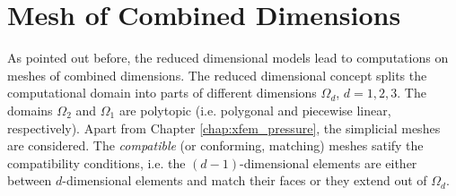 \section{Mesh of Combined Dimensions} \label{sec:mesh_combined}
As pointed out before, the reduced dimensional models lead to computations on meshes of combined dimensions.
The reduced dimensional concept splits the computational domain into parts of different dimensions
$\Omega_d$, $d=1,2,3$. The domains $\Omega_2$ and $\Omega_1$ are polytopic (i.e. polygonal and piecewise linear, respectively).
Apart from Chapter \ref{chap:xfem_pressure}, the simplicial meshes are considered.
The \emph{compatible} (or conforming, matching) meshes satify the compatibility conditions, i.e.
the $(d-1)$-dimensional elements are either between $d$-dimensional elements and
match their faces or they extend out of $\Omega_d$. 






